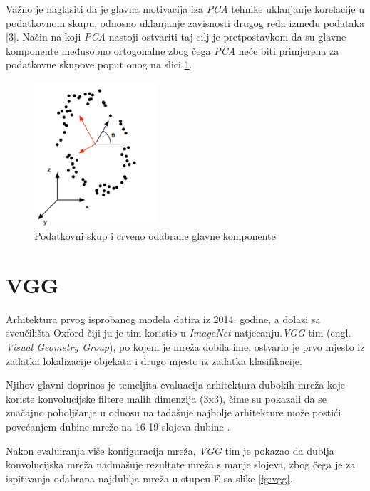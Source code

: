 \documentclass[times, utf8, proizvoljni, numeric]{fer}
\begin{document}
Važno je naglasiti da je glavna motivacija iza \textit{PCA} tehnike uklanjanje korelacije u podatkovnom skupu, odnosno uklanjanje zavisnosti drugog reda između podataka [3]. Način na koji \textit{PCA} nastoji ostvariti taj cilj je pretpostavkom da su glavne komponente međusobno ortogonalne zbog čega \textit{PCA} neće biti primjerena za podatkovne skupove poput onog na slici \ref{fg:pca_problem}.

\begin{figure}[H]
	\begin{center}
		\captionsetup{justification=centering}
		\includegraphics[width=0.4\textwidth]{./imgs/pca_problem.png}
		\caption{Podatkovni skup i crveno odabrane glavne komponente \cite{PCA}}
		\label{fg:pca_problem}
	\end{center}
\end{figure}


\section{VGG}

Arhitektura prvog isprobanog modela datira iz 2014. godine, a dolazi sa sveučilišta Oxford čiji ju je tim koristio u \textit{ImageNet} natjecanju.\textit{VGG} tim (engl. \textit{Visual Geometry Group}), po kojem je mreža dobila ime, ostvario je prvo mjesto iz zadatka lokalizacije objekata i drugo mjesto iz zadatka klasifikacije.

Njihov glavni doprinos je temeljita evaluacija arhitektura dubokih mreža koje koriste konvolucijske filtere malih dimenzija (3x3), čime su pokazali da se značajno poboljšanje u odnosu na tadašnje najbolje arhitekture može postići povećanjem dubine mreže na 16-19 slojeva dubine \cite{VGG}. 

Nakon evaluiranja više konfiguracija mreža, \textit{VGG} tim je pokazao da dublja konvolucijska mreža nadmašuje rezultate mreža s manje slojeva, zbog čega je za ispitivanja odabrana najdublja mreža u stupcu E sa slike \ref{fg:vgg}.
\end{document}

